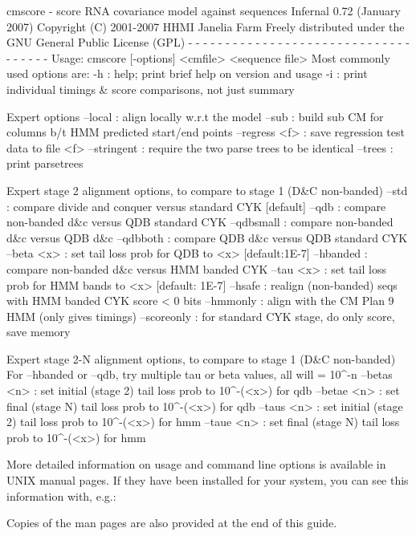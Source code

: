 \begin{sreoutput}
cmscore - score RNA covariance model against sequences
Infernal 0.72 (January 2007)
Copyright (C) 2001-2007 HHMI Janelia Farm
Freely distributed under the GNU General Public License (GPL)
- - - - - - - - - - - - - - - - - - - - - - - - - - - - - - - - - - - -
Usage: cmscore [-options] <cmfile> <sequence file>
  Most commonly used options are:
   -h     : help; print brief help on version and usage
   -i     : print individual timings & score comparisons, not just summary

  Expert options
   --local       : align locally w.r.t the model
   --sub         : build sub CM for columns b/t HMM predicted start/end points
   --regress <f> : save regression test data to file <f>
   --stringent   : require the two parse trees to be identical
   --trees       : print parsetrees

  Expert stage 2 alignment options, to compare to stage 1 (D&C non-banded)
   --std         : compare divide and conquer versus standard CYK [default]
   --qdb         : compare non-banded d&c versus QDB standard CYK
   --qdbsmall    : compare non-banded d&c versus QDB d&c
   --qdbboth     : compare        QDB d&c versus QDB standard CYK
   --beta <x>    : set tail loss prob for QDB to <x> [default:1E-7]
   --hbanded     : compare non-banded d&c versus HMM banded CYK
   --tau <x>     : set tail loss prob for HMM bands to <x> [default: 1E-7]
   --hsafe       : realign (non-banded) seqs with HMM banded CYK score < 0 bits
   --hmmonly     : align with the CM Plan 9 HMM (only gives timings)
   --scoreonly   : for standard CYK stage, do only score, save memory

  Expert stage 2-N alignment options, to compare to stage 1 (D&C non-banded)
  For --hbanded or --qdb, try multiple tau or beta values, all will = 10^-n
   --betas <n>   : set initial (stage 2) tail loss prob to 10^-(<x>) for qdb
   --betae <n>   : set final   (stage N) tail loss prob to 10^-(<x>) for qdb
   --taus <n>    : set initial (stage 2) tail loss prob to 10^-(<x>) for hmm
   --taue <n>    : set final   (stage N) tail loss prob to 10^-(<x>) for hmm

\end{sreoutput}

More detailed information on usage and command line options is
available in UNIX manual pages. If they have been installed for your
system, you can see this information with, e.g.:


Copies of the man pages are also provided at the end of this guide.











